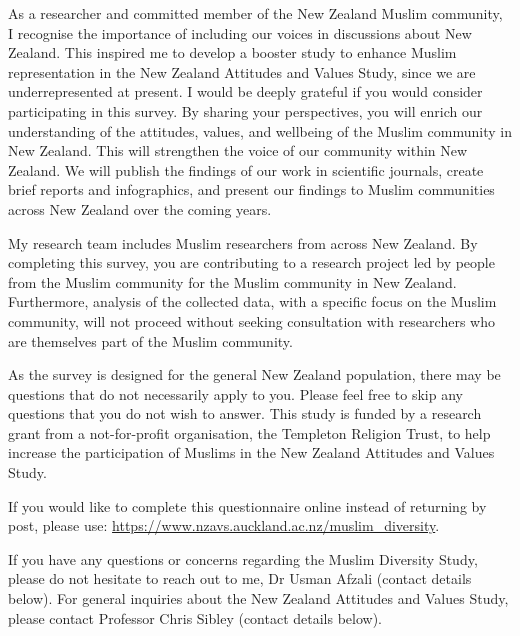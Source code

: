 \documentclass[
]{interact}
\begin{document}
\noindent As a researcher and committed member of the New Zealand Muslim
community, I recognise the importance of including our voices in
discussions about New Zealand. This inspired me to develop a booster
study to enhance Muslim representation in the New Zealand Attitudes and
Values Study, since we are underrepresented at present. I would be
deeply grateful if you would consider participating in this survey. By
sharing your perspectives, you will enrich our understanding of the
attitudes, values, and wellbeing of the Muslim community in New Zealand.
This will strengthen the voice of our community within New Zealand. We
will publish the findings of our work in scientific journals, create
brief reports and infographics, and present our findings to Muslim
communities across New Zealand over the coming years.

\noindent My research team includes Muslim researchers from across New
Zealand. By completing this survey, you are contributing to a research
project led by people from the Muslim community for the Muslim community
in New Zealand. Furthermore, analysis of the collected data, with a
specific focus on the Muslim community, will not proceed without seeking
consultation with researchers who are themselves part of the Muslim
community.

\noindent As the survey is designed for the general New Zealand
population, there may be questions that do not necessarily apply to you.
Please feel free to skip any questions that you do not wish to answer.
This study is funded by a research grant from a not-for-profit
organisation, the Templeton Religion Trust, to help increase the
participation of Muslims in the New Zealand Attitudes and Values Study.

\begin{tcolorbox}[enhanced jigsaw, arc=.35mm, leftrule=.75mm, breakable, colframe=quarto-callout-color-frame, opacityback=0, rightrule=.15mm, bottomrule=.15mm, toprule=.15mm, left=2mm, colback=white]

If you would like to complete this questionnaire online instead of
returning by post, please use:
\url{https://www.nzavs.auckland.ac.nz/muslim_diversity}.

\end{tcolorbox}

\noindent If you have any questions or concerns regarding the Muslim
Diversity Study, please do not hesitate to reach out to me, Dr Usman
Afzali (contact details below). For general inquiries about the New
Zealand Attitudes and Values Study, please contact Professor Chris
Sibley (contact details below).
\end{document}
